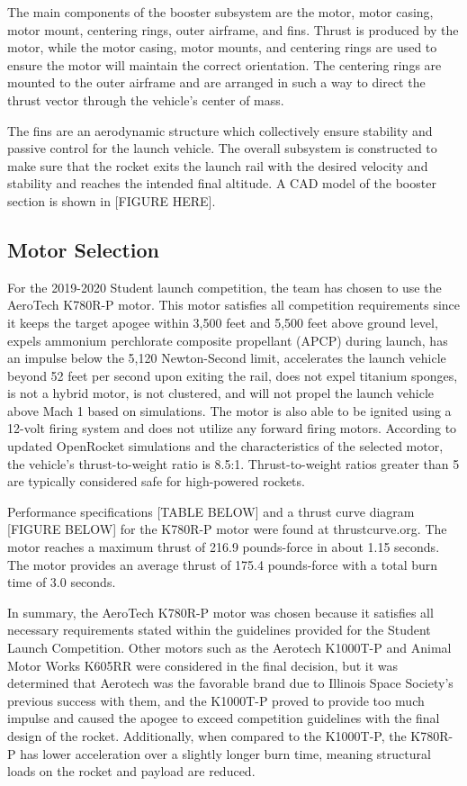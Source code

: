 The main components of the booster subsystem are the motor, motor casing, motor mount, centering rings, outer airframe, and fins. Thrust is produced by the motor, while the motor casing, motor mounts, and centering rings are used to ensure the motor will maintain the correct orientation. The centering rings are mounted to the outer airframe and are arranged in such a way to direct the thrust vector through the vehicle’s center of mass.

The fins are an aerodynamic structure which collectively ensure stability and passive control for the launch vehicle. The overall subsystem is constructed to make sure that the rocket exits the launch rail with the desired velocity and stability and reaches the intended final altitude. A CAD model of the booster section is shown in [FIGURE HERE].

    \subsection{Motor Selection}
For the 2019-2020 Student launch competition, the team has chosen to use the AeroTech K780R-P motor. This motor satisfies all competition requirements since it keeps the target apogee within 3,500 feet and 5,500 feet above ground level, expels ammonium perchlorate composite propellant (APCP) during launch, has an impulse below the 5,120 Newton-Second limit, accelerates the launch vehicle beyond 52 feet per second upon exiting the rail, does not expel titanium sponges, is not a hybrid motor, is not clustered, and will not propel the launch vehicle above Mach 1 based on simulations. The motor is also able to be ignited using a 12-volt firing system and does not utilize any forward firing motors. According to updated OpenRocket simulations and the characteristics of the selected motor, the vehicle’s thrust-to-weight ratio is 8.5:1. Thrust-to-weight ratios greater than 5 are typically considered safe for high-powered rockets.

Performance specifications [TABLE BELOW] and a thrust curve diagram [FIGURE BELOW] for the K780R-P motor were found at thrustcurve.org. The motor reaches a maximum thrust of 216.9 pounds-force in about 1.15 seconds. The motor provides an average thrust of 175.4 pounds-force with a total burn time of 3.0 seconds.

In summary, the AeroTech K780R-P motor was chosen because it satisfies all necessary requirements stated within the guidelines provided for the Student Launch Competition. Other motors such as the Aerotech K1000T-P and Animal Motor Works K605RR were considered in the final decision, but it was determined that Aerotech was the favorable brand due to Illinois Space Society’s previous success with them, and the K1000T-P proved to provide too much impulse and caused the apogee to exceed competition guidelines with the final design of the rocket. Additionally, when compared to the K1000T-P, the K780R-P has lower acceleration over a slightly longer burn time, meaning structural loads on the rocket and payload are reduced.

